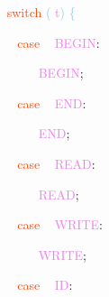 \documentclass[8, usernames, dvipsnames]{beamer}
\begin{document}
\begin{frame}
\textcolor{White}{\   }
\textcolor{OrangeRed}{switch}
\textcolor{SkyBlue}{(}
\textcolor{Violet}{t}\textcolor{SkyBlue}{)}
\textcolor{SkyBlue}{\{ }

 \textcolor{White}{\   }
\textcolor{White}{\   }
\textcolor{OrangeRed}{case}
\textcolor{White}{\ }
\textcolor{Violet}{BEGIN}\textcolor{Sepia}{:}

 \textcolor{White}{\   }
\textcolor{White}{\   }
\textcolor{White}{\   }
\textcolor{OrangeRed}{	}
\textcolor{White}{\ }
\textcolor{Violet}{BEGIN}\textcolor{Sepia}{;}

 \textcolor{White}{\   }
\textcolor{White}{\   }
\textcolor{OrangeRed}{case}
\textcolor{White}{\ }
\textcolor{Violet}{END}\textcolor{Sepia}{:}

 \textcolor{White}{\   }
\textcolor{White}{\   }
\textcolor{White}{\   }
\textcolor{OrangeRed}{	}
\textcolor{White}{\ }
\textcolor{Violet}{END}\textcolor{Sepia}{;}

 \textcolor{White}{\   }
\textcolor{White}{\   }
\textcolor{OrangeRed}{case}
\textcolor{White}{\ }
\textcolor{Violet}{READ}\textcolor{Sepia}{:}

 \textcolor{White}{\   }
\textcolor{White}{\   }
\textcolor{White}{\   }
\textcolor{OrangeRed}{	}
\textcolor{White}{\ }
\textcolor{Violet}{READ}\textcolor{Sepia}{;}

 \textcolor{White}{\   }
\textcolor{White}{\   }
\textcolor{OrangeRed}{case}
\textcolor{White}{\ }
\textcolor{Violet}{WRITE}\textcolor{Sepia}{:}

 \textcolor{White}{\   }
\textcolor{White}{\   }
\textcolor{White}{\   }
\textcolor{OrangeRed}{	}
\textcolor{White}{\ }
\textcolor{Violet}{WRITE}\textcolor{Sepia}{;}

 \textcolor{White}{\   }
\textcolor{White}{\   }
\textcolor{OrangeRed}{case}
\textcolor{White}{\ }
\textcolor{Violet}{ID}\textcolor{Sepia}{:}

 \end{frame}
\end{document}
